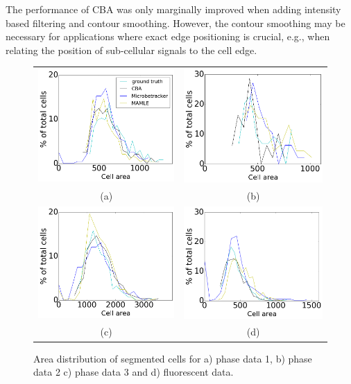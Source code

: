 \documentclass[journal]{IEEEtran}
\begin{document}
The performance of CBA was only marginally improved when adding intensity based filtering and contour smoothing. However, the contour smoothing may be necessary for applications where exact edge positioning is crucial, e.g., when relating the position of sub-cellular signals to the cell edge.

\begin{figure}[!h]
	\centering
	\begin{tabular}{c c }
		\includegraphics[width=0.45\linewidth]{phasdat1areadist.png} & \includegraphics[width=0.45\linewidth]{phasdat2areadist.png} \\
		(a) & (b)\\
		\includegraphics[width=0.45\linewidth]{phasdat3areadist.png}&\includegraphics[width=0.45\linewidth]{fluoareadist.png}\\
		(c) & (d)
	\end{tabular}
	\caption{ Area distribution of segmented cells for a) phase data 1, b) phase data 2 c) phase data 3 and d) fluorescent data. }
	\label{fig:areadistribution}
	
\end{figure}
\end{document}

